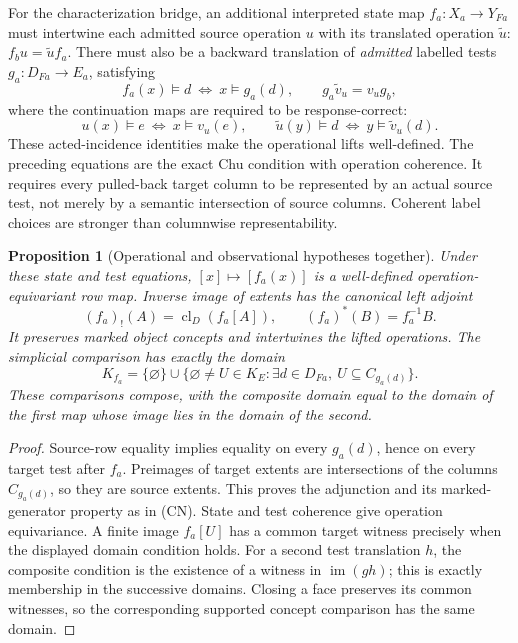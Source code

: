 \documentclass[11pt]{article}
\newtheorem{proposition}[theorem]{Proposition}
\theoremstyle{definition}\newtheorem{definition}[theorem]{Definition}
\theoremstyle{remark}\newtheorem{remark}[theorem]{Remark}
\newcommand{\cl}{\operatorname{cl}}
\newcommand{\im}{\operatorname{im}}
\begin{document}
For the characterization bridge, an additional interpreted state map
$f_a:X_a\to Y_{Fa}$ must intertwine each admitted source operation $u$
with its translated operation $\widetilde u$:
$f_bu=\widetilde u f_a$. There must also be a backward translation of
\emph{admitted} labelled tests $g_a:D_{Fa}\to E_a$, satisfying
\[
 f_a(x)\models d\ \Longleftrightarrow\ x\models g_a(d),
 \qquad g_a\widetilde v_u=v_ug_b,
\]
where the continuation maps are required to be response-correct:
\[
 u(x)\models e\ \Longleftrightarrow\ x\models v_u(e),\qquad
 \widetilde u(y)\models d\ \Longleftrightarrow\ y\models\widetilde v_u(d).
\]
These acted-incidence identities make the operational lifts well-defined.
The preceding equations are the exact Chu condition with operation coherence.
It requires every pulled-back target column to be represented by an
actual source test, not merely by a semantic intersection of source columns.
Coherent label choices are stronger than columnwise representability.

\begin{proposition}[Operational and observational hypotheses together]
Under these state and test equations, $[x]\mapsto[f_a(x)]$ is a
well-defined operation-equivariant row map. Inverse image of extents has
the canonical left adjoint
\[
 (f_a)_!(A)=\cl_D(f_a[A]),\qquad (f_a)^*(B)=f_a^{-1}B.
\]
It preserves marked object concepts and intertwines the lifted operations.
The simplicial comparison has exactly the domain
\[
 K_{f_a}=\{\varnothing\}\cup
 \{\varnothing\ne U\in K_E:\exists d\in D_{Fa},\ U\subseteq C_{g_a(d)}\}.
\]
These comparisons compose, with the composite domain equal to the domain
of the first map whose image lies in the domain of the second.
\end{proposition}
\begin{proof}
Source-row equality implies equality on every $g_a(d)$, hence on every
target test after $f_a$. Preimages of target extents are intersections
of the columns $C_{g_a(d)}$, so they are source extents. This proves the
adjunction and its marked-generator property as in (CN). State and test
coherence give operation equivariance. A finite image $f_a[U]$ has a
common target witness precisely when the displayed domain condition holds.
For a second test translation $h$, the composite condition is the
existence of a witness in $\im(gh)$; this is exactly membership in the
successive domains. Closing a face preserves its common witnesses,
so the corresponding supported concept comparison has the same domain.
\end{proof}
\end{document}
